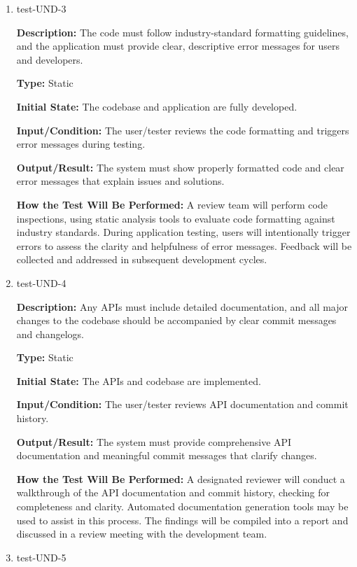 \documentclass[12pt, titlepage]{article}
\begin{document}
\begin{enumerate}
\item{test-UND-3\\}

\textbf{Description:} The code must follow industry-standard formatting guidelines, and the application must provide clear, descriptive error messages for users and developers.

\textbf{Type:} Static
					
\textbf{Initial State:} The codebase and application are fully developed.
					
\textbf{Input/Condition:} The user/tester reviews the code formatting and triggers error messages during testing.
					
\textbf{Output/Result:} The system must show properly formatted code and clear error messages that explain issues and solutions.
					
\textbf{How the Test Will Be Performed:} A review team will perform code inspections, using static analysis tools to evaluate code formatting against industry standards. During application testing, users will intentionally trigger errors to assess the clarity and helpfulness of error messages. Feedback will be collected and addressed in subsequent development cycles.

\item{test-UND-4\\}

\textbf{Description:} Any APIs must include detailed documentation, and all major changes to the codebase should be accompanied by clear commit messages and changelogs.

\textbf{Type:} Static
					
\textbf{Initial State:} The APIs and codebase are implemented.
					
\textbf{Input/Condition:} The user/tester reviews API documentation and commit history.
					
\textbf{Output/Result:} The system must provide comprehensive API documentation and meaningful commit messages that clarify changes.
					
\textbf{How the Test Will Be Performed:} A designated reviewer will conduct a walkthrough of the API documentation and commit history, checking for completeness and clarity. Automated documentation generation tools may be used to assist in this process. The findings will be compiled into a report and discussed in a review meeting with the development team.

\item{test-UND-5\\}


\end{enumerate}
\end{document}
